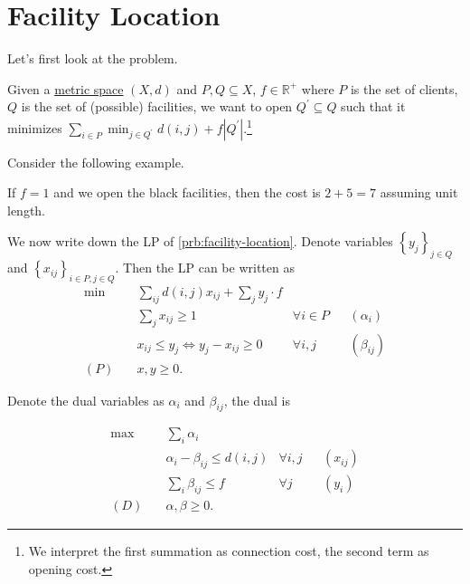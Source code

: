 \section{Facility Location}
Let's first look at the problem.

\begin{problem}\label{prb:facility-location}
Given a \hyperref[rmk:metric-space]{metric space} \((X, d)\) and \(P,  Q\subseteq X\), \(f\in \mathbb{R} ^+\) where \(P\) is the set of clients, \(Q\) is the set of (possible) facilities, we want to open \(Q^\prime \subseteq Q\) such that it minimizes \(\sum_{i\in P} \min _{j\in Q^\prime } d(i, j) + f\left\vert Q^\prime  \right\vert\).\footnote{We interpret the first summation as connection cost, the second term as opening cost.}
\end{problem}

\begin{eg}
	Consider the following example.
	\begin{center}
	\end{center}
	If \(f = 1\) and we open the black facilities, then the cost is \(2 + 5 = 7\) assuming unit length.
\end{eg}

We now write down the LP of \autoref{prb:facility-location}. Denote variables \(\left\{ y_{j} \right\}_{j\in Q}\) and \(\left\{ x_{ij} \right\}_{i\in P, j\in Q}\). Then the LP can be written as
\[
	\begin{aligned}
		\min~    & \sum_{ij} d(i, j) x_{ij} + \sum_{j} y_{j} \cdot f                                     \\
		         & \sum_{j}x_{ij} \geq 1                             & \forall i\in P &  & (\alpha _i)   \\
		         & x_{ij} \leq y_j \iff y_j - x_{ij} \geq 0          & \forall i, j   &  & (\beta_{ij} ) \\
		(P)\quad & x, y \geq 0.
	\end{aligned}
\]

Denote the dual variables as \(\alpha _i\) and \(\beta_{ij} \), the dual is

\[
	\begin{aligned}
		\max~    & \sum_{i} \alpha _i                                                 \\
		         & \alpha _i - \beta _{ij} \leq d(i, j) & \forall i, j &  & (x_{ij} ) \\
		         & \sum_{i} \beta _{ij} \leq f          & \forall j    &  & (y_i)     \\
		(D)\quad & \alpha , \beta \geq 0.
	\end{aligned}
\]

